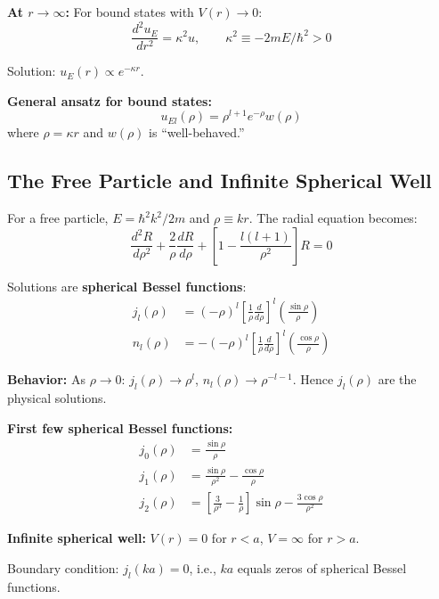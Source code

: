 \documentclass[11pt,a4paper]{article}
\begin{document}
\textbf{At $r \to \infty$:} For bound states with $V(r) \to 0$:
\begin{equation}
\frac{d^2 u_E}{dr^2} = \kappa^2 u, \qquad \kappa^2 \equiv -2mE/\hbar^2 > 0
\tag{3.277}
\end{equation}

Solution: $u_E(r) \propto e^{-\kappa r}$.

\textbf{General ansatz for bound states:}
\begin{equation}
u_{El}(\rho) = \rho^{l+1}e^{-\rho}w(\rho)
\tag{3.278}
\end{equation}
where $\rho = \kappa r$ and $w(\rho)$ is ``well-behaved.''

\subsection{The Free Particle and Infinite Spherical Well}

For a free particle, $E = \hbar^2 k^2/2m$ and $\rho \equiv kr$. The radial equation becomes:
\begin{equation}
\frac{d^2 R}{d\rho^2} + \frac{2}{\rho}\frac{dR}{d\rho} + \left[1 - \frac{l(l+1)}{\rho^2}\right]R = 0
\tag{3.281}
\end{equation}

Solutions are \textbf{spherical Bessel functions}:
\begin{align}
j_l(\rho) &= (-\rho)^l\left[\frac{1}{\rho}\frac{d}{d\rho}\right]^l\left(\frac{\sin\rho}{\rho}\right) \tag{3.282a} \\
n_l(\rho) &= -(-\rho)^l\left[\frac{1}{\rho}\frac{d}{d\rho}\right]^l\left(\frac{\cos\rho}{\rho}\right) \tag{3.282b}
\end{align}

\textbf{Behavior:} As $\rho \to 0$: $j_l(\rho) \to \rho^l$, $n_l(\rho) \to \rho^{-l-1}$. Hence $j_l(\rho)$ are the physical solutions.

\textbf{First few spherical Bessel functions:}
\begin{align}
j_0(\rho) &= \frac{\sin\rho}{\rho} \tag{3.284} \\
j_1(\rho) &= \frac{\sin\rho}{\rho^2} - \frac{\cos\rho}{\rho} \tag{3.285} \\
j_2(\rho) &= \left[\frac{3}{\rho^3} - \frac{1}{\rho}\right]\sin\rho - \frac{3\cos\rho}{\rho^2} \tag{3.286}
\end{align}

\textbf{Infinite spherical well:} $V(r) = 0$ for $r < a$, $V = \infty$ for $r > a$.

Boundary condition: $j_l(ka) = 0$, i.e., $ka$ equals zeros of spherical Bessel functions.
\end{document}

